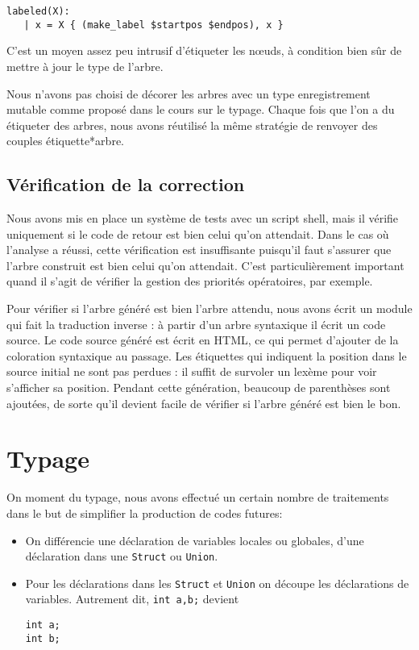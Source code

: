 \documentclass[a4paper]{article}
\begin{document}
\begin{verbatim}
labeled(X):
   | x = X { (make_label $startpos $endpos), x }
\end{verbatim}

C'est un moyen assez peu intrusif d'étiqueter les nœuds, à condition bien sûr de mettre à jour le type de l'arbre.

Nous n'avons pas choisi de décorer les arbres avec un type
 enregistrement mutable comme proposé dans le cours sur le typage.
Chaque fois que l'on a du étiqueter des arbres, nous avons réutilisé la
même stratégie de renvoyer des couples étiquette*arbre.

\subsection{Vérification de la correction}
\label{subsec:html}

Nous avons mis en place un système de tests avec un script shell, mais il vérifie uniquement si le code de retour est bien celui qu'on attendait.
Dans le cas où l'analyse a réussi, cette vérification est insuffisante puisqu'il faut s'assurer que l'arbre construit est bien celui qu'on attendait.
C'est particulièrement important quand il s'agit de vérifier la gestion des priorités opératoires, par exemple.

Pour vérifier si l'arbre généré est bien l'arbre attendu, nous avons écrit un module qui fait la traduction inverse :
à partir d'un arbre syntaxique il écrit un code source.
Le code source généré est écrit en HTML, ce qui permet d'ajouter de la coloration syntaxique au passage.
Les étiquettes qui indiquent la position dans le source initial ne sont pas perdues :
il suffit de survoler un lexème pour voir s'afficher sa position.
Pendant cette génération, beaucoup de parenthèses sont ajoutées, de sorte qu'il devient facile de vérifier si l'arbre généré est bien le bon.

\section{Typage}

On moment du typage, nous avons effectué un certain nombre de traitements
dans le but de simplifier la production de codes futures:
\begin{itemize}
\item On différencie une déclaration de variables locales ou globales, d'une
déclaration dans une \texttt{Struct} ou \texttt{Union}.
\item Pour les déclarations dans les \texttt{Struct} et \texttt{Union} on
découpe les déclarations de variables. Autrement dit, \texttt{int a,b;}
devient 
\begin{verbatim}
int a;
int b;
\end{verbatim}
\end{itemize}
\end{document}
